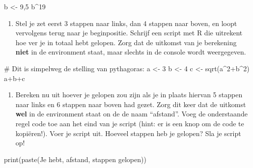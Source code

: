 \documentclass[
  a4paper,
]{scrbook}
\newenvironment{Shaded}{\begin{snugshade}}{\end{snugshade}}
\newcommand{\CommentTok}[1]{\textcolor[rgb]{0.37,0.37,0.37}{#1}}
\newcommand{\DecValTok}[1]{\textcolor[rgb]{0.68,0.00,0.00}{#1}}
\newcommand{\FunctionTok}[1]{\textcolor[rgb]{0.28,0.35,0.67}{#1}}
\newcommand{\NormalTok}[1]{\textcolor[rgb]{0.00,0.23,0.31}{#1}}
\newcommand{\OtherTok}[1]{\textcolor[rgb]{0.00,0.23,0.31}{#1}}
\newcommand{\SpecialCharTok}[1]{\textcolor[rgb]{0.37,0.37,0.37}{#1}}
\newcommand{\StringTok}[1]{\textcolor[rgb]{0.13,0.47,0.30}{#1}}
\providecommand{\tightlist}{%
  \setlength{\itemsep}{0pt}\setlength{\parskip}{0pt}}\usepackage{longtable,booktabs,array}
\theoremstyle{definition}
\theoremstyle{remark}
\begin{document}
\begin{Shaded}
\begin{Highlighting}[]
\NormalTok{b }\OtherTok{\textless{}{-}} \DecValTok{9}\NormalTok{,}\DecValTok{5}
\NormalTok{b}\SpecialCharTok{\^{}}\DecValTok{19}
\end{Highlighting}
\end{Shaded}

\begin{enumerate}
\def\labelenumi{\arabic{enumi}.}
\setcounter{enumi}{2}
\tightlist
\item
  Stel je zet eerst 3 stappen naar links, dan 4 stappen naar boven, en
  loopt vervolgens terug naar je beginpositie. Schrijf een script met R
  die uitrekent hoe ver je in totaal hebt gelopen. Zorg dat de uitkomst
  van je berekening \textbf{niet} in de environment staat, maar slechts
  in de console wordt weergegeven.
\end{enumerate}

\begin{Shaded}
\begin{Highlighting}[]
\CommentTok{\# Dit is simpelweg de stelling van pythagoras:}
\NormalTok{a }\OtherTok{\textless{}{-}} \DecValTok{3}
\NormalTok{b }\OtherTok{\textless{}{-}} \DecValTok{4}
\NormalTok{c }\OtherTok{\textless{}{-}} \FunctionTok{sqrt}\NormalTok{(a}\SpecialCharTok{\^{}}\DecValTok{2}\SpecialCharTok{+}\NormalTok{b}\SpecialCharTok{\^{}}\DecValTok{2}\NormalTok{)}
\NormalTok{a}\SpecialCharTok{+}\NormalTok{b}\SpecialCharTok{+}\NormalTok{c}
\end{Highlighting}
\end{Shaded}

\begin{enumerate}
\def\labelenumi{\arabic{enumi}.}
\setcounter{enumi}{3}
\tightlist
\item
  Bereken nu uit hoever je gelopen zou zijn als je in plaats hiervan 5
  stappen naar links en 6 stappen naar boven had gezet. Zorg dit keer
  dat de uitkomst \textbf{wel} in de environment staat on de de naam
  ``afstand''. Voeg de onderstaande regel code toe aan het eind van je
  script (hint: er is een knop om de code te kopiëren!). Voer je script
  uit. Hoeveel stappen heb je gelopen? Sla je script op!
\end{enumerate}

\begin{Shaded}
\begin{Highlighting}[]
\FunctionTok{print}\NormalTok{(}\FunctionTok{paste}\NormalTok{(}\StringTok{\textquotesingle{}Je hebt\textquotesingle{}}\NormalTok{, afstand, }\StringTok{\textquotesingle{}stappen gelopen\textquotesingle{}}\NormalTok{))}
\end{Highlighting}
\end{Shaded}
\end{document}
